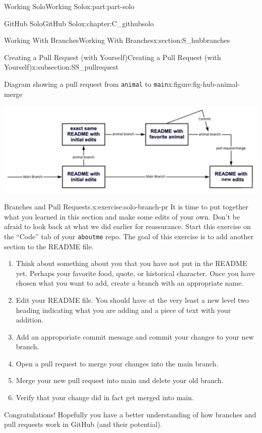 \documentclass[oneside,10pt,]{book}
\newcommand{\mono}[1]{\texttt{#1}}
\begin{document}
\begin{partptx}{Working Solo}{}{Working Solo}{}{}{x:part:part-solo}
\begin{chapterptx}{GitHub Solo}{}{GitHub Solo}{}{}{x:chapter:C_githubsolo}
\begin{sectionptx}{Working With Branches}{}{Working With Branches}{}{}{x:section:S_hubbranches}
\begin{subsectionptx}{Creating a Pull Request (with Yourself)}{}{Creating a Pull Request (with Yourself)}{}{}{x:subsection:SS_pullrequest}
\begin{figureptx}{Diagram showing a pull request from \mono{animal} to \mono{main}}{x:figure:fig-hub-animal-merge}{}%
\begin{image}{0.05}{0.9}{0.05}%
\includegraphics[width=\linewidth]{external/hub_animal_merge.pdf}
\end{image}%
\tcblower
\end{figureptx}%
\begin{inlineexercise}{Branches and Pull Requests.}{x:exercise:solo-branch-pr}%
It is time to put together what you learned in this section and make some edits of your own. Don't be afraid to look back at what we did earlier for reassurance. Start this exercise on the ``Code'' tab of your \mono{aboutme} repo. The goal of this exercise is to add another section to the README file.%
\begin{enumerate}[font=\bfseries,label=(\alph*),ref=\alph*]
\item{}Think about something about you that you have not put in the README yet. Perhaps your favorite food, quote, or historical character. Once you have chosen what you want to add, create a branch with an appropriate name.%
\item{}Edit your README file. You should have at the very least a new level two heading indicating what you are adding and a piece of text with your addition.%
\item{}Add an approporiate commit message and commit your changes to your new branch.%
\item{}Open a pull request to merge your changes into the main branch.%
\item{}Merge your new pull request into main and delete your old branch.%
\item{}Verify that your change did in fact get merged into main.%
\end{enumerate}
\end{inlineexercise}%
\end{subsectionptx}
\begin{conclusion}{}%
Congratulations! Hopefully you have a better understanding of how branches and pull requests work in GitHub (and their potential).%

\end{conclusion}
\end{sectionptx}
\end{chapterptx}
\end{partptx}
\end{document}

